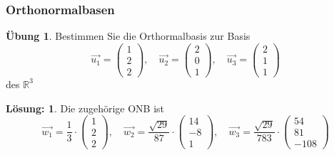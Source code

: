 \documentclass[hyperref={pdfpagelabels=false}]{beamer}
\theoremstyle{plain}%
\theoremstyle{definition}
\newtheorem*{uebung}{Übung}
\newtheorem*{sol}{Lösung:}
\theoremstyle{remark}
\def \R{\mathbb R}
\newcommand{\vektor}[1]{\overrightarrow{#1}}
\begin{document}
\begin{frame}
\frametitle{Orthonormalbasen}

\begin{uebung}
Bestimmen Sie die Orthormalbasis zur Basis 
  	$$ \vektor{u_1} = \left( \begin{matrix} 1 \\ 2 \\ 2 \end{matrix} \right), \quad 
   	\vektor{u_2} = \left( \begin{matrix} 2 \\ 0 \\ 1 \end{matrix} \right), \quad 
   	\vektor{u_3} = \left( \begin{matrix} 2 \\ 1\\ 1 \end{matrix} \right)  $$
des $\R^3$
\end{uebung}

\pause \pause 

\begin{sol}
Die zugehörige ONB ist 
  	$$ \vektor{w_1} = \frac {1}{3} \cdot \left( \begin{matrix} 1 \\ 2 \\ 2 \end{matrix} \right), \quad 
   	\vektor{w_2} = \frac {\sqrt{29}}{87} \cdot \left( \begin{matrix} 14 \\ -8 \\ 1 \end{matrix} \right), \quad 
   	\vektor{w_3} = \frac {\sqrt{29}}{783} \cdot \left( \begin{matrix} 54 \\ 81 \\ -108 \end{matrix} \right)  $$

\end{sol}

\end{frame}
\end{document}
